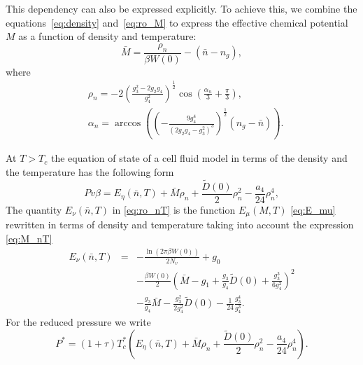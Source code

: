 \documentclass[12pt]{article}
\begin{document}
	This dependency can also be expressed explicitly. To achieve this, we combine the equations~\eqref{eq:density} and~\eqref{eq:ro_M} to express the effective chemical potential $M$ as a function of density and temperature:
	\begin{equation}\label{eq:M_nT}
		\bar M = \frac{\rho_{n}}{\beta W(0)} - (\bar n - n_g),
	\end{equation}
	where
	\begin{align} \label{eq:ro_nT}
		 & \rho_{n} = - 2 \left(\frac{g_3^2 - 2g_2 g_4}{g_4^2} \right)^{\frac{1}{2}} \cos \left( \frac{\alpha_n}{3} + \frac{\pi}{3} \right), \\
		 & \alpha_n = \arccos \left( \left( - \frac{9 g_4^4}{\left( 2 g_2 g_4 - g_3^2\right)^3}\right)^{\frac{1}{2}} (n_g - \bar n)\right). \nonumber 
	\end{align}
	
	At $T>T_c$ the equation of state of a cell fluid model in terms of the density and the temperature has the following form
	\begin{equation}\label{eq:eosNT}
	Pv\beta = E_\eta (\bar n,T) + \bar M \rho_{n} + \frac{\tilde D(0)}{2} \rho_{n}^2 - \frac{a_4}{24} \rho_{n}^4,
	\end{equation}
 The quantity $E_\nu (\bar n, T)$ in \eqref{eq:ro_nT} is the function $E_\mu (M,T)$ \eqref{eq:E_mu} rewritten in terms of density and temperature taking into account the expression \eqref{eq:M_nT}
	\begin{eqnarray}\label{eq:E_nu}
 		E_\nu (\bar{n}, T) & = & - \frac{\ln (2\pi \beta W(0))}{2 N_v}  +  g_0 
 		\nonumber\\
 		&& - \frac{\beta W(0)}{2} 
 		\left(\bar{M} - g_1 + \frac{g_3}{g_4} \tilde{D}(0) + \frac{g_3^3}{6g_4^2} \right)^{2} 
 		\nonumber\\
 		&& - \frac{g_3}{g_4} {\bar{M}} - \frac{g_3^2}{2 g_4^2}  \tilde D(0) - \frac{1}{24} \frac{g_3^4}{g_4^3}. 
 	\end{eqnarray}
 For the reduced pressure we write
 \begin{equation}
 	\label{eq:eosPTn_reduced}
 	P^* = (1 + \tau)T^*_c \left(E_\eta (\bar{n},T) + \bar{M} \rho_{n} + \frac{\tilde D(0)}{2} \rho_{n}^2 - \frac{a_4}{24} \rho_{n}^4\right).
 \end{equation}
	
\end{document}

